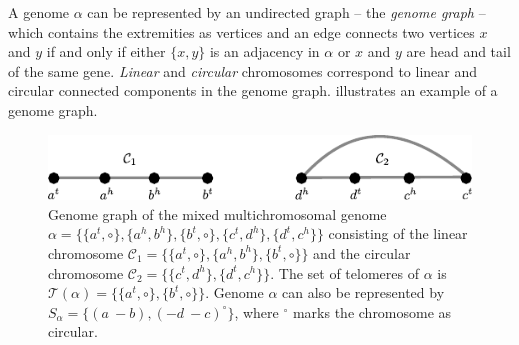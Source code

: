 \documentclass{svmult}
\begin{document}
A genome $\alpha$ can be represented by an undirected graph -- the \emph{genome graph} -- which contains the
extremities as vertices and an edge connects two vertices $x$ and $y$ if and
only if either $\{x,y\}$ is an adjacency in $\alpha$ or $x$ and $y$ are head and tail of the same gene.
\emph{Linear} and \emph{circular} chromosomes correspond to linear and 
circular connected components in the genome graph. 
 illustrates an example of a genome graph.
%

\begin{figure}
	\centering
	\includegraphics[width=.65\textwidth]{figures/genome_graph_example.pdf}
	\caption{Genome graph of the mixed multichromosomal genome
	$\alpha=\{\{a^t,\circ\},\{a^h,b^h\},\{b^t,\circ\},
	\{c^t,d^h\},\{d^t,c^h\}\}$ consisting of the linear chromosome
	$\mathcal{C}_1=\{\{a^t,\circ\},\{a^h,b^h\},\{b^t,\circ\}\}$ 
	and the circular chromosome $\mathcal{C}_2=\{\{c^t,d^h\},\{d^t,c^h\}\}$.
	The set of telomeres of $\alpha$ is
	$\mathcal{T}(\alpha)=\{\{a^t,\circ\},\{b^t,\circ\}\}$.
	Genome $\alpha$ can also be represented by $S_\alpha=\{
	(a~-{b}),(-{d}~-{c})^\circ\}$, where $^\circ$ marks the chromosome as
	circular.}
	\label{fig:genome_graph}
\end{figure}
\end{document}
